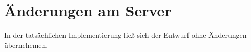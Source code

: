 
\section{Änderungen am Server}

    In der tatsächlichen Implementierung ließ sich der Entwurf ohne Änderungen übernehemen.
